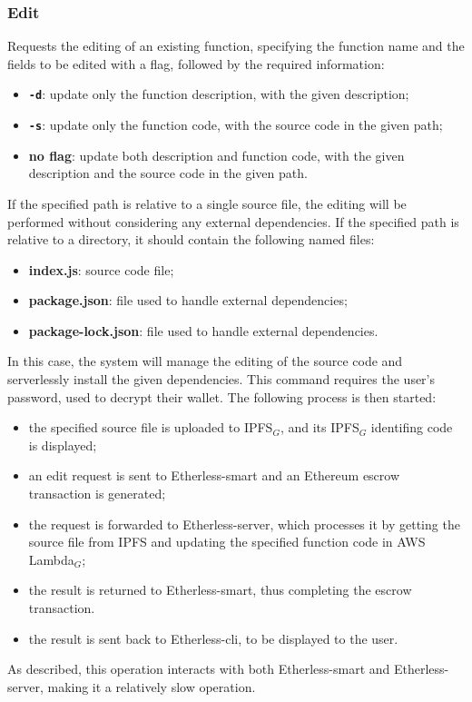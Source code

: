 	\subsubsection{Edit}
	Requests the editing of an existing function, specifying the function name and the fields to be edited with a flag, followed by the required information:
	\begin{itemize}
		\item \textbf{\texttt{-d}}: update only the function description, with the given description;
		\item \textbf{\texttt{-s}}: update only the function code, with the source code in the given path;
		\item \textbf{no flag}: update both description and function code, with the given description and the source code in the given path.
	\end{itemize}
	If the specified path is relative to a single source file, the editing will be performed without considering any external dependencies. If the specified path is relative to a directory, it should contain the following named files:
	\begin{itemize}
		\item \textbf{index.js}: source code file;
		\item \textbf{package.json}: file used to handle external dependencies;
		\item \textbf{package-lock.json}: file used to handle external dependencies.
	\end{itemize}
	In this case, the system will manage the editing of the source code and serverlessly install the given dependencies. This command requires the user's password, used to decrypt their wallet. The following process is then started:
	\begin{itemize}
		\item the specified source file is uploaded to IPFS$_{G}$, and its IPFS$_{G}$ identifing code is displayed;
		\item an edit request is sent to Etherless-smart and an Ethereum escrow transaction is generated;
		\item the request is forwarded to Etherless-server, which processes it by getting the source file from IPFS and updating the specified function code in AWS Lambda$_{G}$;
		\item the result is returned to Etherless-smart, thus completing the escrow transaction.
		\item the result is sent back to Etherless-cli, to be displayed to the user.
	\end{itemize}
	As described, this operation interacts with both Etherless-smart and Etherless-server, making it a relatively slow operation.
